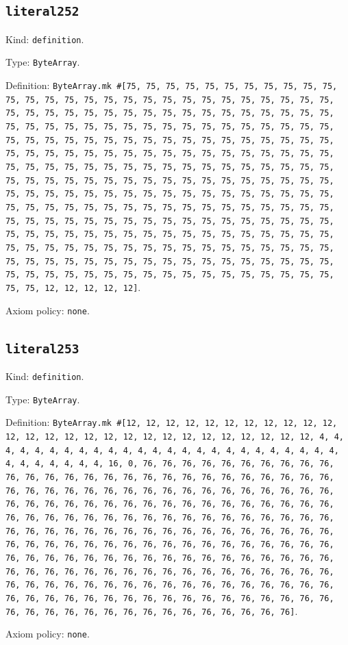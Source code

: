 \documentclass[11pt]{article}
\begin{document}
\subsection*{\texttt{literal252}}
\noindent Kind: \texttt{definition}.\par
\noindent Type: \texttt{ByteArray}.\par
\noindent Definition: \texttt{ByteArray.mk \#[75, 75, 75, 75, 75, 75, 75, 75, 75, 75, 75, 75, 75, 75, 75, 75, 75, 75, 75, 75, 75, 75, 75, 75, 75, 75, 75, 75, 75, 75, 75, 75, 75, 75, 75, 75, 75, 75, 75, 75, 75, 75, 75, 75, 75, 75, 75, 75, 75, 75, 75, 75, 75, 75, 75, 75, 75, 75, 75, 75, 75, 75, 75, 75, 75, 75, 75, 75, 75, 75, 75, 75, 75, 75, 75, 75, 75, 75, 75, 75, 75, 75, 75, 75, 75, 75, 75, 75, 75, 75, 75, 75, 75, 75, 75, 75, 75, 75, 75, 75, 75, 75, 75, 75, 75, 75, 75, 75, 75, 75, 75, 75, 75, 75, 75, 75, 75, 75, 75, 75, 75, 75, 75, 75, 75, 75, 75, 75, 75, 75, 75, 75, 75, 75, 75, 75, 75, 75, 75, 75, 75, 75, 75, 75, 75, 75, 75, 75, 75, 75, 75, 75, 75, 75, 75, 75, 75, 75, 75, 75, 75, 75, 75, 75, 75, 75, 75, 75, 75, 75, 75, 75, 75, 75, 75, 75, 75, 75, 75, 75, 75, 75, 75, 75, 75, 75, 75, 75, 75, 75, 75, 75, 75, 75, 75, 75, 75, 75, 75, 75, 75, 75, 75, 75, 75, 75, 75, 75, 75, 75, 75, 75, 75, 75, 75, 75, 75, 75, 75, 75, 75, 75, 75, 75, 75, 75, 75, 75, 75, 75, 75, 75, 75, 75, 75, 75, 75, 75, 75, 75, 75, 75, 75, 75, 75, 75, 75, 75, 75, 75, 75, 12, 12, 12, 12, 12]}.\par
\noindent Axiom policy: \texttt{none}.\par
\subsection*{\texttt{literal253}}
\noindent Kind: \texttt{definition}.\par
\noindent Type: \texttt{ByteArray}.\par
\noindent Definition: \texttt{ByteArray.mk \#[12, 12, 12, 12, 12, 12, 12, 12, 12, 12, 12, 12, 12, 12, 12, 12, 12, 12, 12, 12, 12, 12, 12, 12, 12, 12, 12, 4, 4, 4, 4, 4, 4, 4, 4, 4, 4, 4, 4, 4, 4, 4, 4, 4, 4, 4, 4, 4, 4, 4, 4, 4, 4, 4, 4, 4, 4, 4, 4, 16, 0, 76, 76, 76, 76, 76, 76, 76, 76, 76, 76, 76, 76, 76, 76, 76, 76, 76, 76, 76, 76, 76, 76, 76, 76, 76, 76, 76, 76, 76, 76, 76, 76, 76, 76, 76, 76, 76, 76, 76, 76, 76, 76, 76, 76, 76, 76, 76, 76, 76, 76, 76, 76, 76, 76, 76, 76, 76, 76, 76, 76, 76, 76, 76, 76, 76, 76, 76, 76, 76, 76, 76, 76, 76, 76, 76, 76, 76, 76, 76, 76, 76, 76, 76, 76, 76, 76, 76, 76, 76, 76, 76, 76, 76, 76, 76, 76, 76, 76, 76, 76, 76, 76, 76, 76, 76, 76, 76, 76, 76, 76, 76, 76, 76, 76, 76, 76, 76, 76, 76, 76, 76, 76, 76, 76, 76, 76, 76, 76, 76, 76, 76, 76, 76, 76, 76, 76, 76, 76, 76, 76, 76, 76, 76, 76, 76, 76, 76, 76, 76, 76, 76, 76, 76, 76, 76, 76, 76, 76, 76, 76, 76, 76, 76, 76, 76, 76, 76, 76, 76, 76, 76, 76, 76, 76, 76, 76, 76, 76, 76, 76, 76, 76, 76, 76, 76, 76, 76, 76, 76, 76, 76, 76, 76, 76, 76]}.\par
\noindent Axiom policy: \texttt{none}.\par
\end{document}
